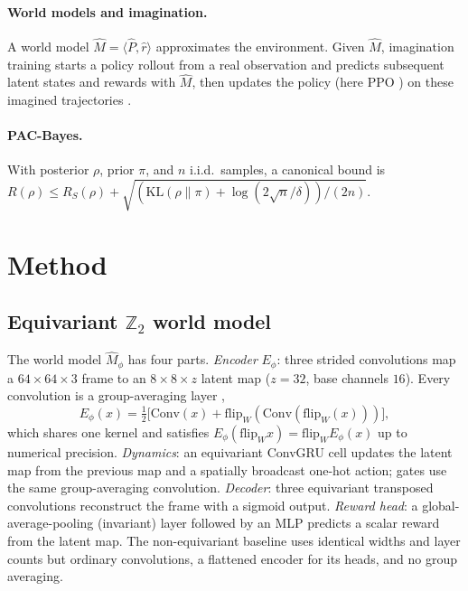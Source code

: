 \documentclass[sigconf,anonymous]{acmart}
\begin{document}
\paragraph{World models and imagination.}
A world model $\hat M=\langle\hat P,\hat r\rangle$ approximates the
environment. Given $\hat M$, imagination training starts a policy rollout
from a real observation and predicts subsequent latent states and rewards
with $\hat M$, then updates the policy (here PPO \cite{ppo2017}) on these
imagined trajectories \cite{dreamerv3}.

\paragraph{PAC-Bayes.}
With posterior $\rho$, prior $\pi$, and $n$ i.i.d.\ samples, a canonical
bound is
$R(\rho)\le R_S(\rho)+\sqrt{(\mathrm{KL}(\rho\|\pi)+\log(2\sqrt n/\delta))/(2n)}$.

\section{Method}\label{sec:method}

\subsection{Equivariant $\mathbb Z_2$ world model}
The world model $\hat M_\phi$ has four parts.
\emph{Encoder} $E_\phi$: three strided convolutions map a
$64\times64\times3$ frame to an $8\times8\times z$ latent map
($z=32$, base channels $16$). Every convolution is a group-averaging layer
\cite{gcnn2016},
\begin{equation}
  E_\phi(x)=\tfrac12\big[\mathrm{Conv}(x)+\mathrm{flip}_W(\mathrm{Conv}(\mathrm{flip}_W(x)))\big],
\end{equation}
which shares one kernel and satisfies
$E_\phi(\mathrm{flip}_W x)=\mathrm{flip}_W E_\phi(x)$ up to numerical
precision. \emph{Dynamics}: an equivariant ConvGRU cell updates the latent
map from the previous map and a spatially broadcast one-hot action; gates
use the same group-averaging convolution. \emph{Decoder}: three equivariant
transposed convolutions reconstruct the frame with a sigmoid output.
\emph{Reward head}: a global-average-pooling (invariant) layer followed by an
MLP predicts a scalar reward from the latent map. The non-equivariant
baseline uses identical widths and layer counts but ordinary convolutions, a
flattened encoder for its heads, and no group averaging.
\end{document}
